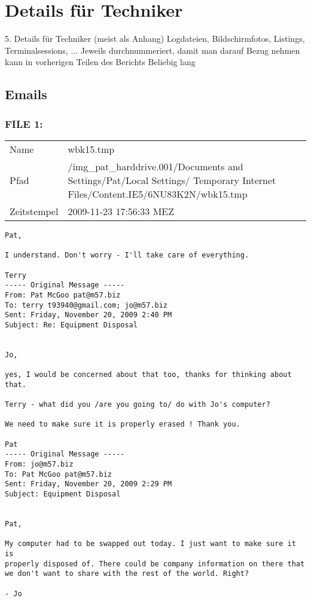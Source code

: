 \chapter{Details für Techniker}
\label{sec:details_tec}

5. Details für Techniker (meist als Anhang)
Logdateien, Bildschirmfotos, Listings, Terminalsessions, ...
Jeweils durchnummeriert, damit man darauf Bezug nehmen kann in vorherigen Teilen des Berichts
Beliebig lang

\section{Emails}
\label{sec:emails}

\subsection{FILE 1:}

\begin{table}[htb]
	\begin{tabular}{p{2cm} p{13.5cm}}
		Name & wbk15.tmp\\
		Pfad & /img_pat_harddrive.001/Documents and Settings/Pat/Local Settings/ Temporary Internet Files/Content.IE5/6NU83K2N/wbk15.tmp\\
		Zeitstempel & 2009-11-23 17:56:33 MEZ
	\end{tabular}
\end{table}	

\begin{lstlisting}
Pat,

I understand. Don't worry - I'll take care of everything.

Terry
----- Original Message ----- 
From: Pat McGoo pat@m57.biz
To: terry t93940@gmail.com; jo@m57.biz
Sent: Friday, November 20, 2009 2:40 PM
Subject: Re: Equipment Disposal


Jo,

yes, I would be concerned about that too, thanks for thinking about 
that.

Terry - what did you /are you going to/ do with Jo's computer?

We need to make sure it is properly erased ! Thank you.

Pat
----- Original Message ----- 
From: jo@m57.biz
To: Pat McGoo pat@m57.biz
Sent: Friday, November 20, 2009 2:29 PM
Subject: Equipment Disposal


Pat,

My computer had to be swapped out today. I just want to make sure it is
properly disposed of. There could be company information on there that 
we don't want to share with the rest of the world. Right?

- Jo
\end{lstlisting}

